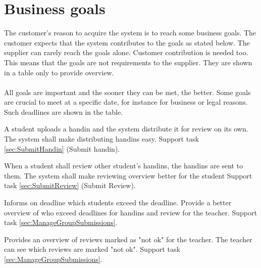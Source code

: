 \documentclass[Main]{subfiles}
\begin{document}
\section{Business goals}
The customer's reason to acquire the system is to reach some business goals. 
The customer expects that the system contributes to the goals as stated below. 
The supplier can rarely reach the goals alone. Customer contribution is needed too. 
This means that the goals are not requirements to the supplier. 
They are shown in a table only to provide overview. 
\\
\\
All goals are important and the sooner they can be met, the better. 
Some goals are crucial to meet at a specific date, for instance for business or legal reasons. 
Such deadlines are shown in the table.

\begin{GoalTable}

\Goal
{A student uploads a handin and the system distribute it for review on its own.}
{The system shall make distributing handins easy.}
{Support task \ref{sec:SubmitHandin} (Submit handin).}
{}

\Goal
{When a student shall review other student's handins, the handins are sent to them.}
{The system shall make reviewing overview better for the student}
{Support task \ref{sec:SubmitReview} (Submit Review).}
{}

\Goal
{Informs on deadline which students exceed the deadline.}
{Provide a better overview of who exceed deadlines for handins and review for the teacher.}
{Support task \ref{sec:ManageGroupSubmissions}.}
{}

\Goal
{Provides an over\-view of reviews marked as "not ok" for the teacher.}
{The teacher can see which reviews are marked "not ok".}
{Support task \ref{sec:ManageGroupSubmissions}.}
{}

\end{GoalTable}
\end{document}
